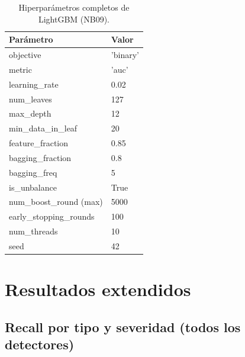 \begin{table}[H]
\centering
\caption{Hiperparámetros completos de LightGBM (NB09).}
\label{tab:hp-lgbm}
\small
\begin{tabularx}{0.8\textwidth}{l l}
\toprule
Parámetro & Valor \\
\midrule
objective               & 'binary' \\
metric                  & 'auc' \\
learning\_rate          & 0.02 \\
num\_leaves             & 127 \\
max\_depth              & 12 \\
min\_data\_in\_leaf     & 20 \\
feature\_fraction       & 0.85 \\
bagging\_fraction       & 0.8 \\
bagging\_freq           & 5 \\
is\_unbalance           & True \\
num\_boost\_round (max) & 5000 \\
early\_stopping\_rounds & 100 \\
num\_threads            & 10 \\
seed                    & 42 \\
\bottomrule
\end{tabularx}
\end{table}

\chapter{Resultados extendidos}
\label{anx:resultados}

\section{Recall por tipo y severidad (todos los detectores)}

